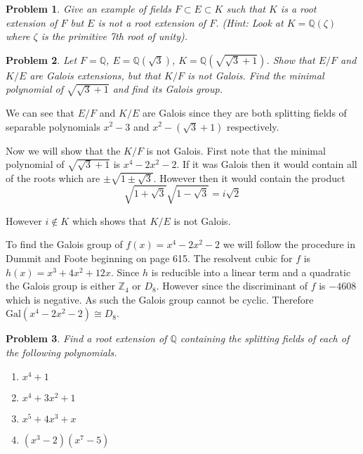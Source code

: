 \documentclass[10pt]{article}
\newcommand{\sk}{\vskip 10mm}
\newcommand{\bb}[1]{\mathbb{#1}}
\theoremstyle{plain}
\newtheorem{problem}{Problem}
\theoremstyle{remark}
\begin{document}
\begin{problem}
  Give an example of fields $F\subset E\subset K$   such that $K$ is a root
  extension of $F$ but $E$ is not a root extension of $F$.
  (Hint: Look at $K=\bb{Q}(\zeta)$ where $\zeta$ is the primitive
  7th root of unity).
\end{problem}

\sk

\begin{problem}
  Let $F=\bb{Q}$, $E=\bb{Q}(\sqrt{3})$, $K=\bb{Q}(\sqrt{\sqrt{3}+1})$.
  Show that $E/F$ and $K/E$ are Galois extensions, but that $K/F$
  is not Galois. Find the minimal polynomial of $\sqrt{\sqrt{3}+1}$
  and find its Galois group.
\end{problem}

We can see that $E/F$ and $K/E$ are Galois since they are
both splitting fields of separable polynomials $x^2-3$ and
$x^2-(\sqrt{3}+1)$ respectively.

Now we will show that the $K/F$ is not Galois. First note that the
minimal polynomial of $\sqrt{\sqrt{3}+1}$ is $x^4-2x^2-2$. If it
was Galois then it would contain all of the roots which are
$\pm\sqrt{1\pm\sqrt{3}}$. However then it would contain the product
\[
  \sqrt{1+\sqrt{3}}\sqrt{1-\sqrt{3}}=i\sqrt{2}
\]

However $i\notin K$ which shows that $K/E$ is not Galois.

To find the Galois group of $f(x)=x^4-2x^2-2$ we will follow the procedure
in Dummit and Foote beginning on page 615. The resolvent cubic for
$f$ is $h(x)=x^3+4x^2+12x$. Since $h$ is reducible into a linear term
and a quadratic the Galois group is either $\bb{Z}_4$ or $D_8$. However
since the discriminant of $f$ is $-4608$ which is negative. As such
the Galois group cannot be cyclic. Therefore $\text{Gal}(x^4-2x^2-2)\cong D_8$.
\sk

\begin{problem}
  Find a root extension of $\bb{Q}$ containing the splitting fields
  of each of the following polynomials.
  \begin{enumerate}
  \item[(a)] $x^4+1$
  \item[(b)] $x^4+3x^2+1$
  \item[(c)] $x^5+4x^3+x$
  \item[(d)] $(x^3-2)(x^7-5)$
  \end{enumerate}
\end{problem}
\sk
\end{document}
